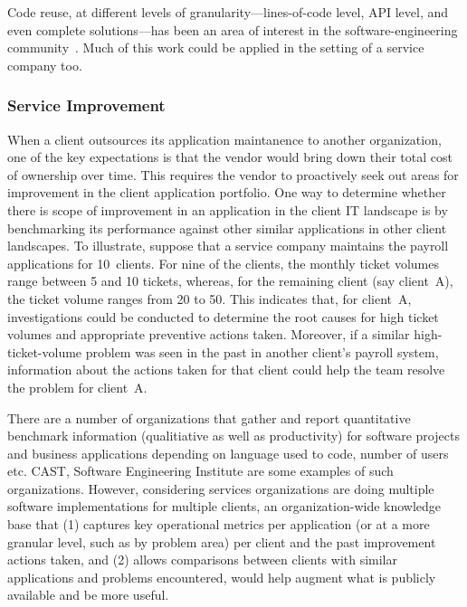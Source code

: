 Code reuse, at different levels of granularity---lines-of-code level, API level,
and even complete solutions---has been an area of interest in the
software-engineering community~\cite{Reiss:2009,Holmes:2013}. Much of this work
could be applied in the setting of a service company too.

\subsubsection{Service Improvement}

When a client outsources its application maintanence to another organization,
one of the key expectations is that the vendor would bring down their total cost
of ownership over time. This requires the vendor to proactively seek out areas
for improvement in the client application portfolio. One way to determine
whether there is scope of improvement in an application in the client IT
landscape is by benchmarking its performance against other similar applications
in other client landscapes. To illustrate, suppose that a service company
maintains the payroll applications for 10~clients. For nine of the clients, the
monthly ticket volumes range between 5 and 10 tickets, whereas, for the
remaining client (say client~A), the ticket volume ranges from 20 to 50. This
indicates that, for client~A, investigations could be conducted to determine the
root causes for high ticket volumes and appropriate preventive actions
taken. Moreover, if a similar high-ticket-volume problem was seen in the past in
another client's payroll system, information about the actions taken for that
client could help the team resolve the problem for client~A.

There are a number of organizations that gather and report quantitative
benchmark information (qualitiative as well as productivity) for software
projects and business applications depending on language used to code, number of
users etc. CAST, Software Engineering Institute are some examples of such
organizations. However, considering services organizations are doing multiple
software implementations for multiple clients, an organization-wide knowledge
base that (1) captures key operational metrics per application (or at a more
granular level, such as by problem area) per client and the past improvement
actions taken, and (2) allows comparisons between clients with similar
applications and problems encountered, would help augment what is publicly
available and be more useful.

